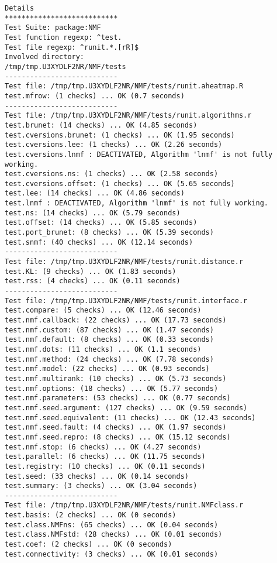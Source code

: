 \documentclass[10pt]{article}
\begin{document}
\begin{verbatim}
Details 
*************************** 
Test Suite: package:NMF 
Test function regexp: ^test. 
Test file regexp: ^runit.*.[rR]$ 
Involved directory: 
/tmp/tmp.U3XYDLF2NR/NMF/tests 
--------------------------- 
Test file: /tmp/tmp.U3XYDLF2NR/NMF/tests/runit.aheatmap.R 
test.mfrow: (1 checks) ... OK (0.7 seconds)
--------------------------- 
Test file: /tmp/tmp.U3XYDLF2NR/NMF/tests/runit.algorithms.r 
test.brunet: (14 checks) ... OK (4.85 seconds)
test.cversions.brunet: (1 checks) ... OK (1.95 seconds)
test.cversions.lee: (1 checks) ... OK (2.26 seconds)
test.cversions.lnmf : DEACTIVATED, Algorithm 'lnmf' is not fully working.
test.cversions.ns: (1 checks) ... OK (2.58 seconds)
test.cversions.offset: (1 checks) ... OK (5.65 seconds)
test.lee: (14 checks) ... OK (4.86 seconds)
test.lnmf : DEACTIVATED, Algorithm 'lnmf' is not fully working.
test.ns: (14 checks) ... OK (5.79 seconds)
test.offset: (14 checks) ... OK (5.85 seconds)
test.port_brunet: (8 checks) ... OK (5.39 seconds)
test.snmf: (40 checks) ... OK (12.14 seconds)
--------------------------- 
Test file: /tmp/tmp.U3XYDLF2NR/NMF/tests/runit.distance.r 
test.KL: (9 checks) ... OK (1.83 seconds)
test.rss: (4 checks) ... OK (0.11 seconds)
--------------------------- 
Test file: /tmp/tmp.U3XYDLF2NR/NMF/tests/runit.interface.r 
test.compare: (5 checks) ... OK (12.46 seconds)
test.nmf.callback: (22 checks) ... OK (17.73 seconds)
test.nmf.custom: (87 checks) ... OK (1.47 seconds)
test.nmf.default: (8 checks) ... OK (0.33 seconds)
test.nmf.dots: (11 checks) ... OK (1.1 seconds)
test.nmf.method: (24 checks) ... OK (7.78 seconds)
test.nmf.model: (22 checks) ... OK (0.93 seconds)
test.nmf.multirank: (10 checks) ... OK (5.73 seconds)
test.nmf.options: (18 checks) ... OK (5.77 seconds)
test.nmf.parameters: (53 checks) ... OK (0.77 seconds)
test.nmf.seed.argument: (127 checks) ... OK (9.59 seconds)
test.nmf.seed.equivalent: (11 checks) ... OK (12.43 seconds)
test.nmf.seed.fault: (4 checks) ... OK (1.97 seconds)
test.nmf.seed.repro: (8 checks) ... OK (15.12 seconds)
test.nmf.stop: (6 checks) ... OK (4.27 seconds)
test.parallel: (6 checks) ... OK (11.75 seconds)
test.registry: (10 checks) ... OK (0.11 seconds)
test.seed: (33 checks) ... OK (0.14 seconds)
test.summary: (3 checks) ... OK (3.04 seconds)
--------------------------- 
Test file: /tmp/tmp.U3XYDLF2NR/NMF/tests/runit.NMFclass.r 
test.basis: (2 checks) ... OK (0 seconds)
test.class.NMFns: (65 checks) ... OK (0.04 seconds)
test.class.NMFstd: (28 checks) ... OK (0.01 seconds)
test.coef: (2 checks) ... OK (0 seconds)
test.connectivity: (3 checks) ... OK (0.01 seconds)

\end{verbatim}
\end{document}
